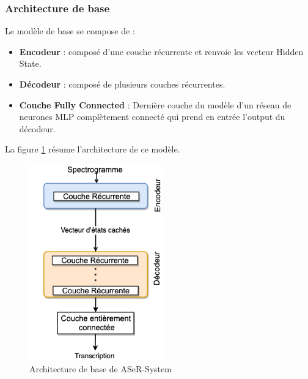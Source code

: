 \subsubsection{Architecture de base}
Le modèle de base se compose de :
\begin{itemize}
    \item \textbf{Encodeur} : composé d'une couche récurrente et renvoie les vecteur Hidden State.
    \item \textbf{Décodeur} : composé de plusieurs couches récurrentes.
    \item \textbf{Couche Fully Connected} : Dernière couche du modèle d'un réseau de neurones MLP complètement connecté qui prend en entrée l'output du décodeur. \\
\end{itemize}

La figure \ref{Baseline} résume l'architecture de ce modèle.
\begin{figure}[H]
    \centering
    \includegraphics[height=240pt]{images/chap3/baseline_model.png}
    \caption{Architecture de base de ASeR-System}
    \label{Baseline}
\end{figure}

